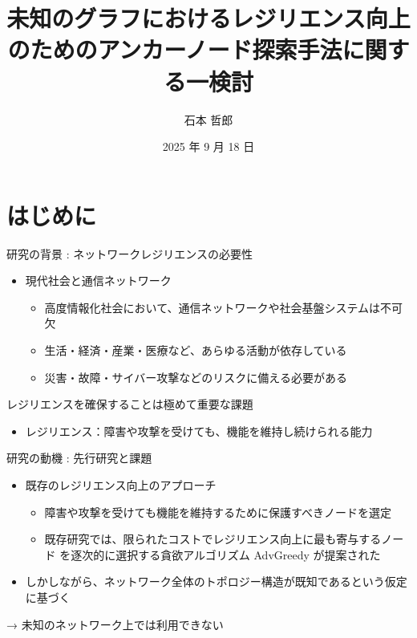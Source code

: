 \documentclass[compress,dvipdfmx,11pt]{beamer}
\title[中間審査]{\bf  未知のグラフにおけるレジリエンス向上のためのアンカーノード探索手法に関する一検討}
\author[]{石本 哲郎}
\institute{関西学院大学 工学部 情報工学課程}
\date{2025 年 9 月 18 日}
\begin{document}
\maketitle

\newcommand{\pivec}{\mathbf \pi}
\newcommand{\xvec}{\mathbf x}
\newcommand{\yvec}{\mathbf y}
\newcommand{\zvec}{\mathbf z}
\newcommand{\Emat}{\mathbf E}
\newcommand{\Imat}{\mathbf I}

\bf
\section{はじめに}
\label{sec:org8d9d03d}
\begin{frame}[label={sec:org3682d4b}]{研究の背景 : ネットワークレジリエンスの必要性}
\begin{itemize}
\item 現代社会と通信ネットワーク
\begin{itemize}
\item 高度情報化社会において、通信ネットワークや社会基盤システムは不可欠
\item 生活・経済・産業・医療など、あらゆる活動が依存している
\item 災害・故障・サイバー攻撃などのリスクに備える必要がある
\end{itemize}
\end{itemize}

\vspace{3mm}

\alert{レジリエンスを確保することは極めて重要な課題}
\begin{itemize}
\item \alert{レジリエンス}：障害や攻撃を受けても、機能を維持し続けられる能力
\end{itemize}
\end{frame}
\begin{frame}[label={sec:org97a22d9}]{研究の動機 : 先行研究と課題}
\begin{itemize}
\item 既存のレジリエンス向上のアプローチ
\begin{itemize}
\item 障害や攻撃を受けても機能を維持するために保護すべきノードを選定
\item 既存研究では、限られたコストでレジリエンス向上に最も寄与するノード
を逐次的に選択する貪欲アルゴリズム AdvGreedy が提案された
\end{itemize}

\item しかしながら、\alert{ネットワーク全体のトポロジー構造が既知}であるという仮定に基づく
\end{itemize}

\vspace{2mm}

→ 未知のネットワーク上では利用できない
\end{frame}
\end{document}
